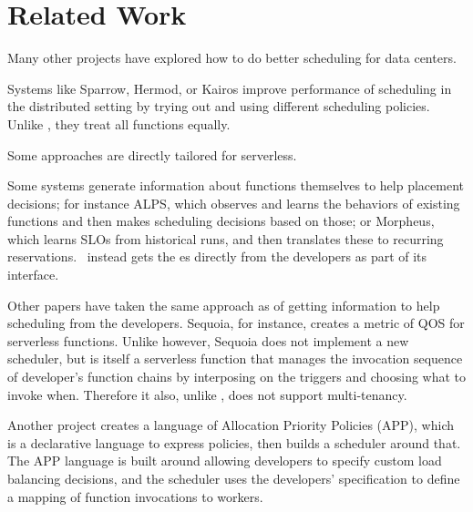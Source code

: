 \section{Related Work}

Many other projects have explored how to do better scheduling for data centers.
 
Systems like Sparrow\cite{sparrow}, Hermod\cite{hermod}, or Kairos\cite{kairos}
improve performance of scheduling in the distributed setting by trying out and
using different scheduling policies. Unlike \sys{}, they treat all functions
equally.

Some approaches are directly tailored for serverless.

Some systems generate information about functions themselves to help placement
decisions; for instance ALPS\cite{alps}, which observes and learns the behaviors
of existing functions and then makes scheduling decisions based on those; or
Morpheus\cite{morpheus}, which learns SLOs from historical runs, and then
translates these to recurring reservations.~\Sys{} instead gets the \class{}es
directly from the developers as part of its interface.


Other papers have taken the same approach as \sys{} of getting information to
help scheduling from the developers. Sequoia\cite{sequoia}, for instance,
creates a metric of QOS for serverless functions. Unlike \sys{} however, Sequoia
does not implement a new scheduler, but is itself a serverless function that
manages the invocation sequence of developer's function chains by interposing on
the triggers and choosing what to invoke when. Therefore it also, unlike
\sys{}, does not support multi-tenancy.

Another project\cite{app-paper} creates a language of Allocation Priority
Policies (APP), which is a declarative language to express policies, then builds
a scheduler around that. The APP language is built around allowing developers to
specify custom load balancing decisions, and the scheduler uses the developers'
specification to define a mapping of function invocations to workers. 
